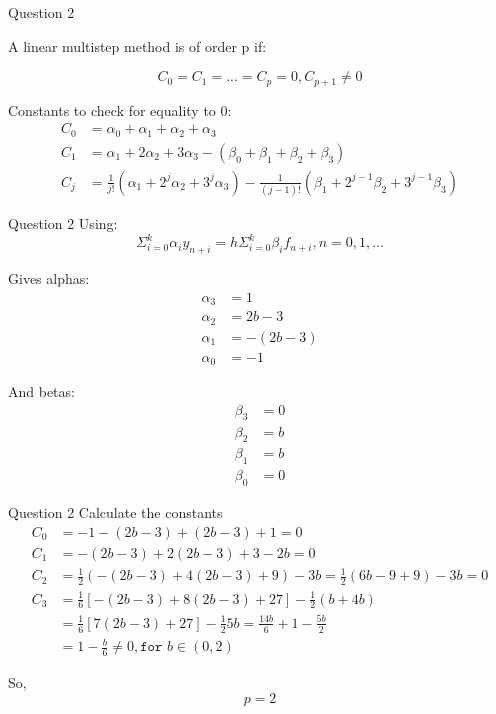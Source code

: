 \documentclass{beamer}
\begin{document}
\begin{frame}{Question 2}

A linear multistep method is of order p if:

$$C_0 = C_1 = ... = C_p = 0, C_{p+1} \ne 0$$

Constants to check for equality to 0:
\begin{align*}
C_0 &= \alpha_0 + \alpha_1 + \alpha_2 + \alpha_3\\
C_1 &= \alpha_1 + 2\alpha_2 + 3\alpha_3 - (\beta_0 + \beta_1 + \beta_2 + \beta_3)\\
	C_j &= \frac{1}{j!} (\alpha_1 + 2^j\alpha_2 + 3^j\alpha_3) - \frac{1}{(j-1)!} (\beta_1 + 2^{j-1}\beta_2 + 3^{j-1}\beta_3)
\end{align*}

\end{frame}

\begin{frame}{Question 2}
Using:\\
$$\Sigma_{i=0}^{k}\alpha_iy_{n+i} = h \Sigma_{i=0}^{k} \beta_i f_{n+i}, n=0,1,\ldots$$

Gives alphas:
\begin{align*}
\alpha_3 &= 1\\ 
\alpha_2 &= 2b - 3\\
\alpha_1 &= -(2b - 3)\\
\alpha_0 &= -1
\end{align*}

And betas:
\begin{align*}
\beta_3 &= 0\\
\beta_2 &= b\\
\beta_1 &= b\\
\beta_0 &= 0
\end{align*}

\end{frame}

\begin{frame}{Question 2}
Calculate the constants
\begin{align*}
C_0 &= -1 - (2b - 3) + (2b - 3) + 1 = 0\\
C_1 &= -(2b - 3) + 2(2b-3) + 3 - 2b = 0\\
C_2 &= \frac{1}{2}(-(2b-3) + 4(2b-3) + 9) - 3b = \frac{1}{2} (6b - 9 + 9) - 3b = 0\\
C_3 &= \frac{1}{6}[-(2b-3) + 8(2b-3) + 27] - \frac{1}{2}(b+4b)\\
    &= \frac{1}{6}[7(2b-3) + 27] - \frac{1}{2}5b = \frac{14b}{6} + 1 - \frac{5b}{2}\\
    &= 1 - \frac{b}{6} \ne 0, \texttt{for } b \in (0,2)
\end{align*}

So,
$$p = 2$$

\end{frame}
\end{document}

